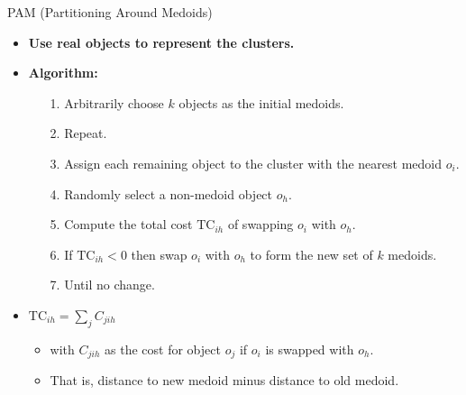 \begin{frame}{PAM (Partitioning Around Medoids)}
	\begin{itemize}
		\item \textbf{Use real objects to represent the clusters.}
		\item \textbf{Algorithm:}
		      \begin{itemize}
			      \item[1.] Arbitrarily choose $k$ objects as the initial medoids.
			      \item[2.] Repeat.
			      \item[3.] \hspace{0.2cm} Assign each remaining object to the
			            cluster with the nearest medoid $o_i$.
			      \item[4.] \hspace{0.2cm} Randomly select a non-medoid object $o_h$.
			      \item[5.] \hspace{0.2cm} Compute the total cost $\text{TC}_{ih}$ of
			            swapping $o_i$ with $o_h$.
			      \item[6.] \hspace{0.2cm} If $\text{TC}_{ih} < 0$ then swap $o_i$
			            with $o_h$ to form the new set of $k$ medoids.
			      \item[7.] Until no change.
		      \end{itemize}
		\item $\text{TC}_{ih} = \sum\limits_{j}C_{jih}$
		      \begin{itemize}
			      \item with $C_{jih}$ as the cost for object $o_j$ if $o_i$ is
			            swapped with $o_h$.
			      \item That is, distance to new medoid minus distance to old medoid.
		      \end{itemize}
	\end{itemize}
\end{frame}

